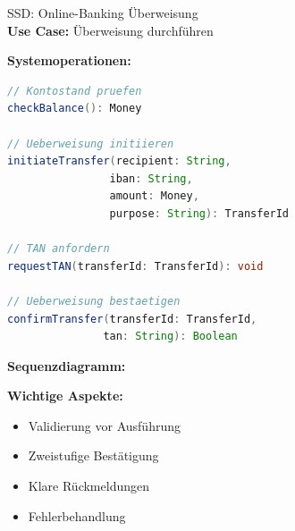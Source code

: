 \begin{example2}{SSD: Online-Banking Überweisung}\\
\textbf{Use Case:} Überweisung durchführen

\textbf{Systemoperationen:}
\begin{lstlisting}[language=Java, style=base]
// Kontostand pruefen
checkBalance(): Money

// Ueberweisung initiieren
initiateTransfer(recipient: String, 
                iban: String, 
                amount: Money, 
                purpose: String): TransferId

// TAN anfordern
requestTAN(transferId: TransferId): void

// Ueberweisung bestaetigen
confirmTransfer(transferId: TransferId, 
               tan: String): Boolean
\end{lstlisting}

\textbf{Sequenzdiagramm:}

\textbf{Wichtige Aspekte:}
\begin{itemize}
    \item Validierung vor Ausführung
    \item Zweistufige Bestätigung
    \item Klare Rückmeldungen
    \item Fehlerbehandlung
\end{itemize}
\end{example2}


